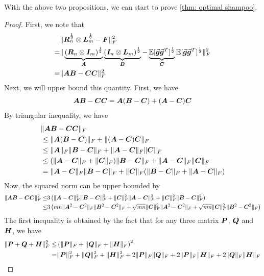 With the above two propositions, we can start to prove \cref{thm: optimal shampoo}.
\begin{proof}
    First, we note that
    \begin{align*}
        &\Vert{\bm{R}}_n^{\frac{1}{2}}\otimes {\bm{L}}_m^{\frac{1}{2}} - {\bm{F}}\Vert_F^2\\
        =& \Vert\underbrace{({\bm{R}}_n\otimes {\bm{I}}_m)^{\frac{1}{2}}}_{{\bm{A}}}\underbrace{({\bm{I}}_n\otimes {\bm{L}}_m)^{\frac{1}{2}}}_{{\bm{B}}}-\underbrace{\mathbb{E}[\vec{\bm{g}}\vec{\bm{g}}^T]^{\frac{1}{2}}}_{{\bm{C}}}\mathbb{E}[\vec{\bm{g}}\vec{\bm{g}}^T]^{\frac{1}{2}}\Vert_F^2\\
        =& \Vert{\bm{A}}{\bm{B}} - {\bm{C}}{\bm{C}}\Vert_F^2
    \end{align*}
    Next, we will upper bound this quantity.
    First, we have
    \begin{align*}
        {\bm{A}}{\bm{B}}-{\bm{C}}{\bm{C}} = {\bm{A}}({\bm{B}}-{\bm{C}}) + ({\bm{A}}-{\bm{C}}){\bm{C}}
    \end{align*}
    By triangular inequality, we have
    \begin{align*}
        &\Vert{\bm{A}}{\bm{B}}-{\bm{C}}{\bm{C}}\Vert_F\\
        &\leq \Vert{\bm{A}}({\bm{B}}-{\bm{C}})\Vert_F+\Vert({\bm{A}}-{\bm{C}}){\bm{C}}\Vert_F \\
        &\leq \Vert{\bm{A}}\Vert_F\Vert{\bm{B}}-{\bm{C}}\Vert_F+ \Vert{\bm{A}}-{\bm{C}}\Vert_F\Vert{\bm{C}}\Vert_F\\
        &\leq (\Vert{\bm{A}}-{\bm{C}}\Vert_F+\Vert{\bm{C}}\Vert_F)\Vert{\bm{B}}-{\bm{C}}\Vert_F+ \Vert{\bm{A}}-{\bm{C}}\Vert_F\Vert{\bm{C}}\Vert_F\\
        &= \Vert{\bm{A}}-{\bm{C}}\Vert_F\Vert{\bm{B}}-{\bm{C}}\Vert_F+\Vert{\bm{C}}\Vert_F(\Vert{\bm{B}}-{\bm{C}}\Vert_F+ \Vert{\bm{A}}-{\bm{C}}\Vert_F)
    \end{align*}
    Now, the squared norm can be upper bounded by 
    \begin{align}
        \Vert{\bm{A}}{\bm{B}}-{\bm{C}}{\bm{C}}\Vert_F^2 \leq& 3\left(\Vert{\bm{A}}-{\bm{C}}\Vert_F^2\Vert{\bm{B}}-{\bm{C}}\Vert_F^2+\Vert{\bm{C}}\Vert_F^2\Vert{\bm{A}}-{\bm{C}}\Vert_F^2+\Vert{\bm{C}}\Vert_F^2\Vert{\bm{B}}-{\bm{C}}\Vert_F^2\right)\nonumber\\
        \leq&3\left(mn\Vert{\bm{A}}^2-{\bm{C}}^2\Vert_F\Vert{\bm{B}}^2-{\bm{C}}^2\Vert_F+\sqrt{mn}\Vert{\bm{C}}\Vert_F^2\Vert{\bm{A}}^2-{\bm{C}}^2\Vert_F+\sqrt{mn}\Vert{\bm{C}}\Vert_F^2\Vert{\bm{B}}^2-{\bm{C}}^2\Vert_F\right)
        \label{eq: proof upper bound shampoo}
    \end{align}
The first inequality is obtained by the fact that for any three matrix ${\bm{P}}$, ${\bm{Q}}$ and ${\bm{H}}$, we have
\begin{align*}
    \Fnorm{\mP+\mQ+\mH}\leq& \left(\Vert\mP\Vert_F+\Vert\mQ\Vert_F+\Vert\mH\Vert_F\right)^2\\
    =& \Fnorm{\mP}+\Fnorm{\mQ}+\Fnorm{\mH} + 2\Vert\mP\Vert_F\Vert\mQ\Vert_F + 2\Vert\mP\Vert_F\Vert\mH\Vert_F+2\Vert\mQ\Vert_F\Vert\mH\Vert_F\\

\end{align*}
\end{proof}

